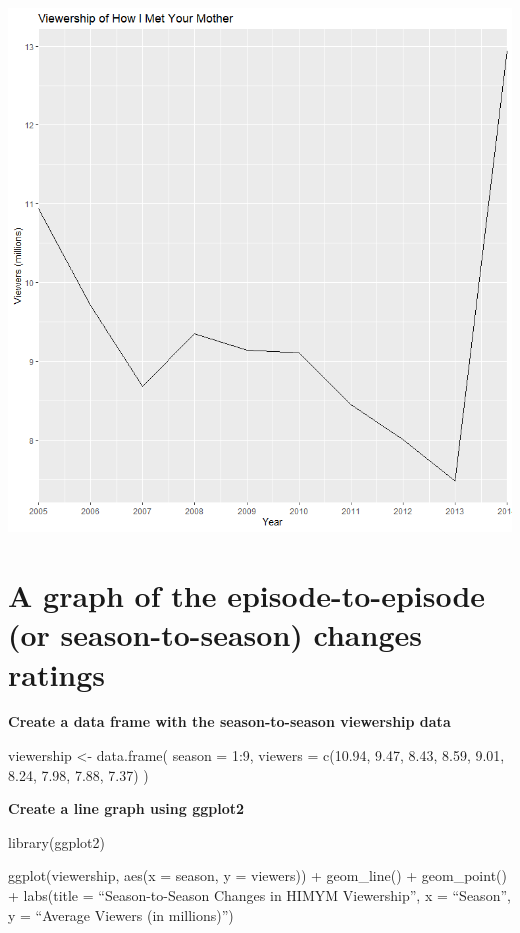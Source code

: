 \documentclass[
  letterpaper,
  DIV=11,
  numbers=noendperiod]{scrartcl}
\begin{document}
\includegraphics{Rplot.png}

\hypertarget{a-graph-of-the-episode-to-episode-or-season-to-season-changes-ratings}{%
\section{A graph of the episode-to-episode (or season-to-season) changes
ratings}\label{a-graph-of-the-episode-to-episode-or-season-to-season-changes-ratings}}

\textbf{Create a data frame with the season-to-season viewership data}

viewership \textless- data.frame( season = 1:9, viewers = c(10.94, 9.47,
8.43, 8.59, 9.01, 8.24, 7.98, 7.88, 7.37) )

\textbf{Create a line graph using ggplot2}

library(ggplot2)

ggplot(viewership, aes(x = season, y = viewers)) + geom\_line() +
geom\_point() + labs(title = ``Season-to-Season Changes in HIMYM
Viewership'', x = ``Season'', y = ``Average Viewers (in millions)'')
\end{document}
